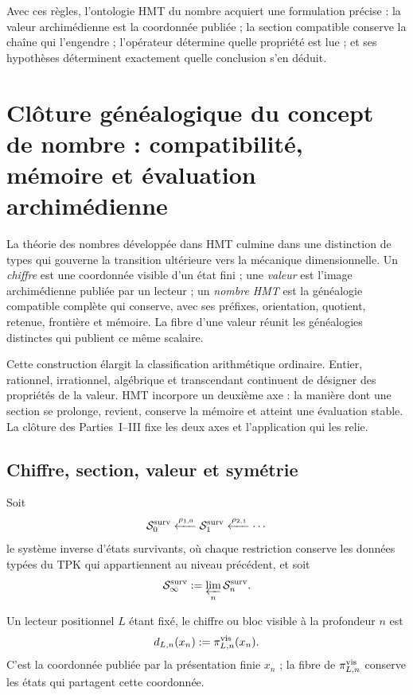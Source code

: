 Avec ces règles, l'ontologie HMT du nombre acquiert une formulation
précise : la valeur archimédienne est la coordonnée publiée ; la section
compatible conserve la chaîne qui l'engendre ; l'opérateur détermine quelle
propriété est lue ; et ses hypothèses déterminent exactement quelle conclusion s'en
déduit.


\section[Clôture généalogique du concept de nombre]{Clôture généalogique du concept de nombre : compatibilité, mémoire et évaluation archimédienne}
\label{p3-83-c44-s2:chap:cierre-genealogico-numero}

La théorie des nombres développée dans HMT culmine dans une distinction de types
qui gouverne la transition ultérieure vers la mécanique dimensionnelle. Un
\emph{chiffre} est une coordonnée visible d'un état fini ; une \emph{valeur}
est l'image archimédienne publiée par un lecteur ; un \emph{nombre HMT} est
la généalogie compatible complète qui conserve, avec ses préfixes,
orientation, quotient, retenue, frontière et mémoire. La fibre d'une valeur
réunit les généalogies distinctes qui publient ce même scalaire.

Cette construction élargit la classification arithmétique ordinaire. Entier,
rationnel, irrationnel, algébrique et transcendant continuent de désigner des
propriétés de la valeur. HMT incorpore un deuxième axe : la manière dont une
section se prolonge, revient, conserve la mémoire et atteint une évaluation
stable. La clôture des Parties~I--III fixe les deux axes et l'application qui les relie.

\subsection{Chiffre, section, valeur et symétrie}

Soit
\[
 \mathcal S_0^{\rm surv}
 \xleftarrow{\rho_{1,0}}
 \mathcal S_1^{\rm surv}
 \xleftarrow{\rho_{2,1}}
 \cdots
\]
le système inverse d'états survivants, où chaque restriction
conserve les données typées du TPK qui appartiennent au niveau précédent, et soit
\[
 \mathcal S_\infty^{\rm surv}
 :=\varprojlim_n\mathcal S_n^{\rm surv}.
\]

\begin{definition}[Chiffre]
\label{p3-83-c44-s2:def:cifra-visible-genealogica}
Un lecteur positionnel \(L\) étant fixé, le chiffre ou bloc visible à la profondeur
\(n\) est
\[
 d_{L,n}(x_n):=\pi^{\rm vis}_{L,n}(x_n).
\]
C'est la coordonnée publiée par la présentation finie \(x_n\) ; la fibre de
\(\pi^{\rm vis}_{L,n}\) conserve les états qui partagent cette coordonnée.
\end{definition}

